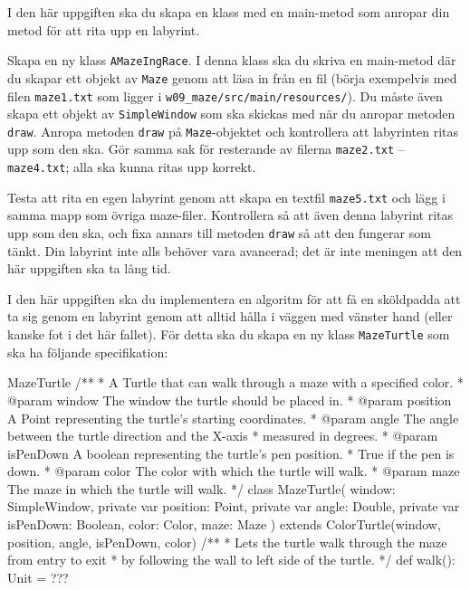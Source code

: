 \Task I den här uppgiften ska du skapa en klass med en main-metod som anropar din metod för att rita upp en labyrint.

\Subtask Skapa en ny klass \texttt{AMazeIngRace}. I denna klass ska du skriva en main-metod där du skapar ett objekt av \texttt{Maze} genom att läsa in från en fil (börja exempelvis med filen \texttt{maze1.txt} som ligger i \texttt{w09\_maze/src/main/resources/}). Du måste även skapa ett objekt av \texttt{SimpleWindow} som ska skickas med när du anropar metoden \texttt{draw}. Anropa  metoden \texttt{draw} på \texttt{Maze}-objektet och kontrollera att labyrinten ritas upp som den ska. Gör samma sak för resterande av filerna \texttt{maze2.txt} -- \texttt{maze4.txt}; alla ska kunna ritas upp korrekt.

\Subtask Testa att rita en egen labyrint genom att skapa en textfil \texttt{maze5.txt} och lägg i samma mapp som övriga maze-filer. Kontrollera så att även denna labyrint ritas upp som den ska, och fixa annars till metoden \texttt{draw} så att den fungerar som tänkt. Din labyrint inte alls behöver vara avancerad; det är inte meningen att den här uppgiften ska ta lång tid.


\Task I den här uppgiften ska du implementera en algoritm för att få en sköldpadda att ta sig genom en labyrint genom att alltid hålla i väggen med vänster hand (eller kanske fot i det här fallet). För detta ska du skapa en ny klass \texttt{MazeTurtle} som ska ha följande specifikation:

\begin{ScalaSpec}{MazeTurtle}
/**
 * A Turtle that can walk through a maze with a specified color.
 * @param window    The window the turtle should be placed in.
 * @param position  A Point representing the turtle's starting coordinates.
 * @param angle     The angle between the turtle direction and the X-axis 
 *                  measured in degrees.
 * @param isPenDown A boolean representing the turtle's pen position. 
 *                  True if the pen is down.
 * @param color     The color with which the turtle will walk.
 * @param maze      The maze in which the turtle will walk.
 */
class MazeTurtle(
    window: SimpleWindow, 
    private var position: Point,
    private var angle: Double, 
    private var isPenDown: Boolean,
    color: Color, 
    maze: Maze
  ) extends ColorTurtle(window, position, angle, isPenDown, color) {
  /**
   * Lets the turtle walk through the maze from entry to exit 
   * by following the wall to left side of the turtle.
   */
  def walk(): Unit = ???
}

\end{ScalaSpec}

